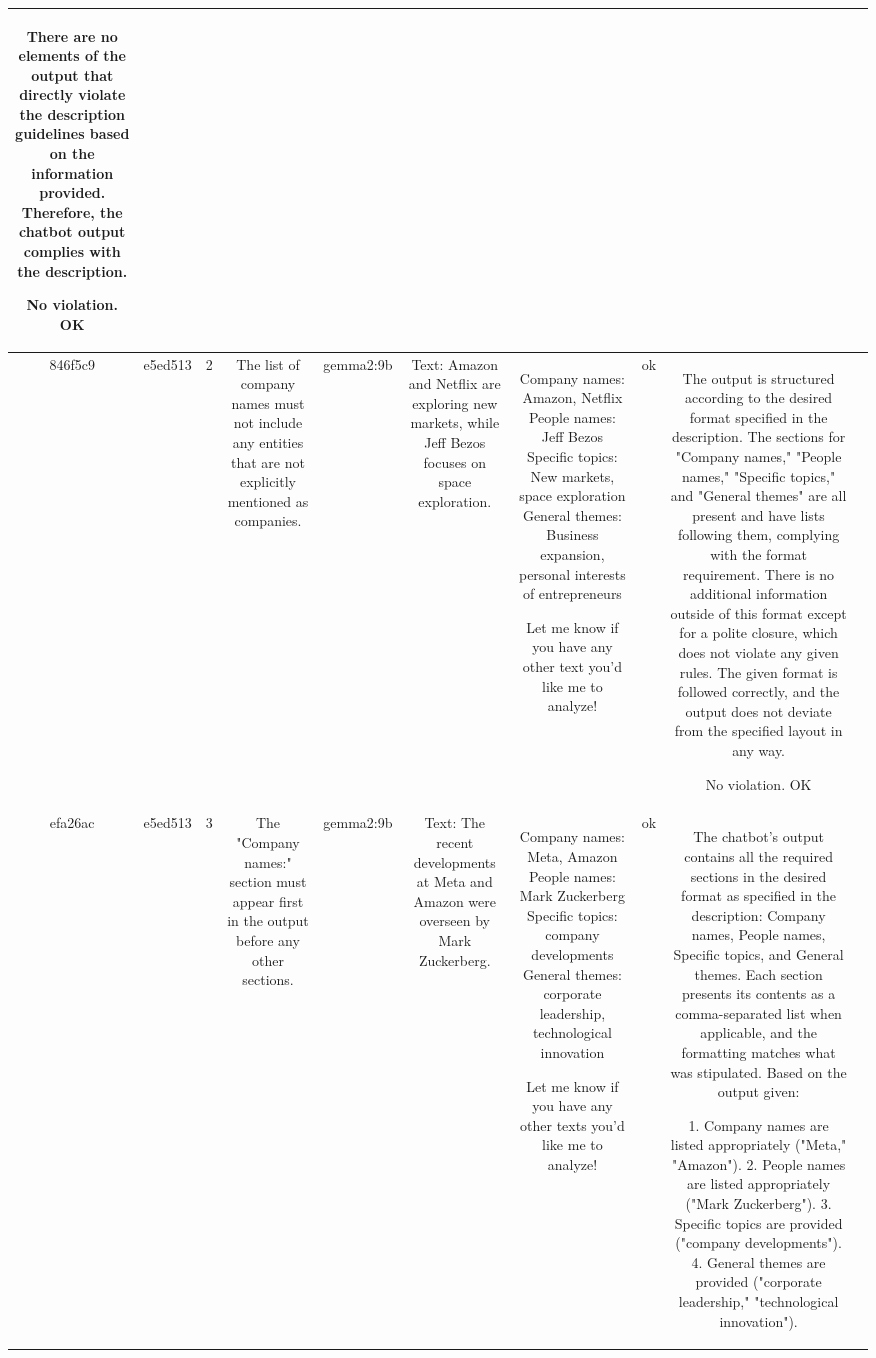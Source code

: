 \begin{table}[h!]
\begin{tabular}{|c|c|c|c|c|c|c|c|c|c|}
There are no elements of the output that directly violate the description guidelines based on the information provided. Therefore, the chatbot output complies with the description. 

No violation.
OK & \\
\hline
846f5c9 & e5ed513 & 2 & The list of company names must not include any entities that are not explicitly mentioned as companies. & gemma2:9b & Text: Amazon and Netflix are exploring new markets, while Jeff Bezos focuses on space exploration. & Company names: Amazon, Netflix 
People names: Jeff Bezos
Specific topics:  New markets, space exploration
General themes: Business expansion, personal interests of entrepreneurs 


 Let me know if you have any other text you'd like me to analyze! 
 & ok & The output is structured according to the desired format specified in the description. The sections for "Company names," "People names," "Specific topics," and "General themes" are all present and have lists following them, complying with the format requirement. There is no additional information outside of this format except for a polite closure, which does not violate any given rules. The given format is followed correctly, and the output does not deviate from the specified layout in any way.

No violation.
OK & \\
\hline
efa26ac & e5ed513 & 3 & The "Company names:" section must appear first in the output before any other sections. & gemma2:9b & Text: The recent developments at Meta and Amazon were overseen by Mark Zuckerberg. & Company names: Meta, Amazon
People names: Mark Zuckerberg
Specific topics: company developments 
General themes: corporate leadership, technological innovation  


Let me know if you have any other texts you'd like me to analyze! 
 & ok & The chatbot's output contains all the required sections in the desired format as specified in the description: Company names, People names, Specific topics, and General themes. Each section presents its contents as a comma-separated list when applicable, and the formatting matches what was stipulated. Based on the output given:

1. Company names are listed appropriately ("Meta," "Amazon").
2. People names are listed appropriately ("Mark Zuckerberg").
3. Specific topics are provided ("company developments").
4. General themes are provided ("corporate leadership," "technological innovation").


\end{tabular}
\end{table}
